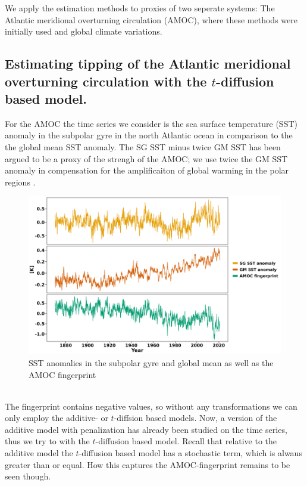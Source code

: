 We apply the estimation methods to proxies of two seperate systems: The Atlantic meridional overturning circulation (AMOC), where these methods were initially used \cite{Ditlevsen2023} and global climate variations.
\subsection{Estimating tipping of the Atlantic meridional overturning circulation with the $t$-diffusion based model.}
For the AMOC the time series we consider is the sea surface temperature (SST) anomaly in the subpolar gyre in the north Atlantic ocean in comparison to the the global mean SST anomaly. The SG SST minus twice GM SST has been argued to be a proxy of the strengh of the AMOC; we use twice the GM SST anomaly in compensation for the amplificaiton of global warming in the polar regions \cite[caption of figure 1]{Ditlevsen2023}.
\begin{figure}[h!]
    \begin{center}
    \includegraphics[scale = .09]{figures/AMOC_data_plot.jpeg}
    \caption{SST anomalies in the subpolar gyre and global mean as well as the AMOC fingerprint}
    \label{figure:AMOC_plot}
    \end{center}
\end{figure}\\
The fingerprint contains negative values, so without any transformations we can only employ the additive- or $t$-diffsion based models. Now, a version of the additive model with penalization has already been studied on the time series, thus we try to with the $t$-diffusion based model. Recall that relative to the additive model the $t$-diffusion based model has a stochastic term, which is alwaus greater than or equal. How this captures the AMOC-fingerprint remains to be seen though.

